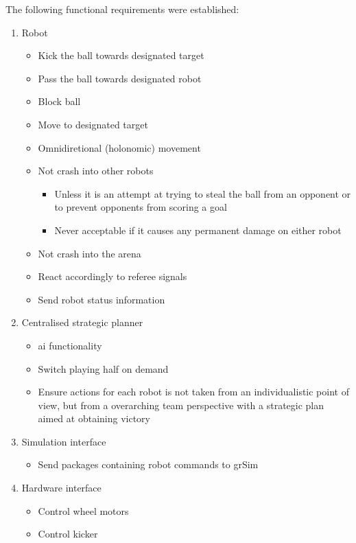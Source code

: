 The following functional requirements were established:
\begin{enumerate}
    \item Robot
    \begin{itemize}
        \item Kick the ball towards designated target
        \item Pass the ball towards designated robot
        \item Block ball
        \item Move to designated target
        \item Omnidiretional (holonomic) movement
        \item Not crash into other robots
        \begin{itemize}
            \item Unless it is an attempt at trying to steal the ball from an opponent or to prevent opponents from scoring a goal
            \item Never acceptable if it causes any permanent damage on either robot
        \end{itemize}
        \item Not crash into the arena
        \item React accordingly to referee signals
        \item Send robot status information
    \end{itemize}
    \item Centralised strategic planner
    \begin{itemize}
        \item \ac{ai} functionality
        \item Switch playing half on demand
        \item Ensure actions for each robot is not taken from an individualistic point of view, but from a overarching team perspective with a strategic plan aimed at obtaining victory
    \end{itemize}
    \item Simulation interface
    \begin{itemize}
        \item Send packages containing robot commands to grSim
    \end{itemize}
    \item Hardware interface
    \begin{itemize}
        \item Control wheel motors
        \item Control kicker

\end{itemize}
\end{enumerate}
